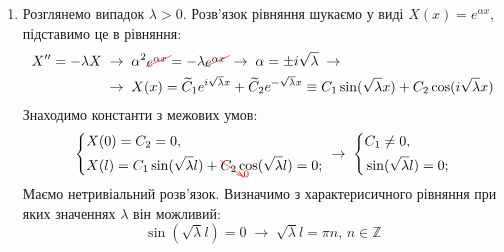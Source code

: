 \documentclass[a4paper, 12pt]{extreport}
\begin{document}
\begin{enumerate}
\begin{enumerate}
        \item Розглянемо випадок $\lambda > 0$. Розв'язок рівняння шукаємо у виді $X(x) = e^{\alpha x}$, підставимо це в рівняння: 
        \begin{equation*}
            \begin{aligned}
                X^{\prime\prime} = -\lambda X
                \;&\to\;
                \alpha^2 \textcolor{red}{\begin{xy}*{\textcolor{black}{e^{\alpha x}}};p+LD;+RU**h@{}+/\jot/**h@{-}\end{xy}} = -\lambda \textcolor{red}{\begin{xy}*{\textcolor{black}{e^{\alpha x}}};p+LD;+RU**h@{}+/\jot/**h@{-}\end{xy}}
                \;\to\;
                \alpha = \pm i\sqrt{\lambda}
                \;\to\\
                &\to\;
                X(x) = \widetilde{C}_1 e^{i\sqrt{\lambda}x} + \widetilde{C}_2 e^{-\sqrt{\lambda}x} \equiv C_1 \sin(\sqrt{\lambda}x) + C_2 \cos({i\sqrt{\lambda}x})
            \end{aligned}
        \end{equation*}
        Знаходимо константи з межових умов:
        \begin{equation*}
            \begin{aligned}
                \left\{ \begin{aligned}
                    &X(0) = C_2 = 0, \\ 
                    &X(l) = C_1 \sin(\sqrt{\lambda}l) + \textcolor{red}{\begin{xy}*{\textcolor{black}{C_2}};p+LU;+RD**h@{}+//**h@{-}*h@{>}*h!LD{\scriptstyle 0}\end{xy}} \cos({\sqrt{\lambda}l}) = 0;
                \end{aligned} \right.
                \;\to\;
                \left\{ \begin{aligned}
                    &C_1 \neq 0, \\ 
                    &\sin(\sqrt{\lambda}l) = 0;
                \end{aligned} \right.
            \end{aligned}
        \end{equation*}
        Маємо нетривіальний розв'язок. Визначимо з характерисичного рівняння при яких значеннях $\lambda$ він можливий:
        \begin{equation*}
            \sin(\sqrt{\lambda}l) = 0
            \;\to\;
            \sqrt{\lambda}l = \pi n, \, n \in \mathbb{Z}

\end{equation*}
\end{enumerate}
\end{enumerate}
\end{document}

